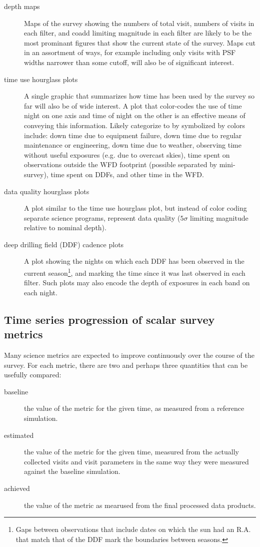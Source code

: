 \begin{description}
\item[{depth maps}] Maps of the survey showing the numbers of total visit, numbers of visits in each filter, and coadd limiting magnitude in each filter are likely to be the most prominant figures that show the current state of the survey. Maps cut in an assortment of ways, for example including only visits with PSF widths narrower than some cutoff, will also be of significant interest.
\item[{time use hourglass plots}] A single graphic that summarizes how time has been used by the survey so far will also be of wide interest. A plot that color-codes the use of time night on one axis and time of night on the other is an effective means of conveying this information. Likely categorize to by symbolized by colors include: down time due to equipment failure, down time due to regular maintenance or engineering, down time due to weather, observing time without useful exposures (e.g. due to overcast skies), time spent on observations outside the WFD footprint (possible separated by mini-survey), time spent on DDFs, and other time in the WFD.
\item[{data quality hourglass plots}] A plot similar to the time use hourglass plot, but instead of color coding separate science programs, represent data quality (\(5\sigma\) limiting magnitude relative to nominal depth).
\item[{deep drilling field (DDF) cadence plots}] A plot showing the nights on which each DDF has been observed in the current season\footnote{Gaps between observations that include dates on which the sun had an R.A. that match that of the DDF mark the boundaries between seasons.}, and marking the time since it was last observed in each filter. Such plots may also encode the depth of exposures in each band on each night.
\end{description}

\subsection{Time series progression of scalar survey metrics}
\label{sec:org69020ba}
Many science metrics are expected to improve continuously over the course of the survey.
For each metric, there are two and perhaps three quantities that can be usefully compared:
\begin{description}
\item[{baseline}] the value of the metric for the given time, as measured from a reference simulation.
\item[{estimated}] the value of the metric for the given time, measured from the actually collected visits and visit parameters in the same way they were measured against the baseline simulation.
\item[{achieved}] the value of the metric as mearused from the final processed data products.
\end{description}

